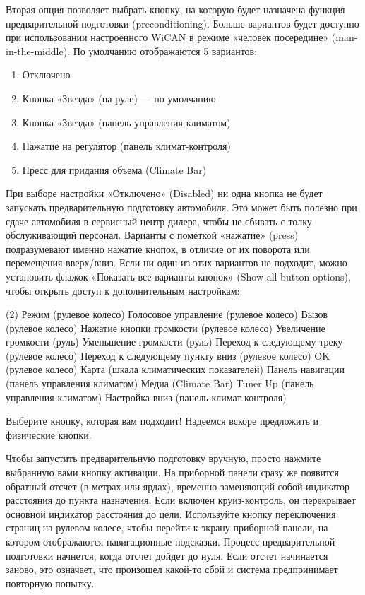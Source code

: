 \documentclass[superscriptaddress,onecolumn,floatfix]{revtex4-2}
\begin{document}
Вторая опция позволяет выбрать кнопку, на которую будет назначена функция предварительной подготовки (preconditioning). Больше вариантов будет доступно при использовании настроенного WiCAN в режиме «человек посередине» (man-in-the-middle). По умолчанию отображаются 5 вариантов:
\begin{enumerate}
  \item Отключено
  \item Кнопка «Звезда» (на руле) — по умолчанию
  \item Кнопка «Звезда» (панель управления климатом)
  \item Нажатие на регулятор (панель климат-контроля)
  \item Пресс для придания объема (Climate Bar)
\end{enumerate}
При выборе настройки «Отключено» (Disabled) ни одна кнопка не будет запускать предварительную подготовку автомобиля. Это может быть полезно при сдаче автомобиля в сервисный центр дилера, чтобы не сбивать с толку обслуживающий персонал. Варианты с пометкой «нажатие» (press) подразумевают именно нажатие кнопок, в отличие от их поворота или перемещения вверх/вниз. Если ни один из этих вариантов не подходит, можно установить флажок «Показать все варианты кнопок» (Show all button options), чтобы открыть доступ к дополнительным настройкам:
\begin{tasks}(2)
  \task Режим (рулевое колесо)
  \task Голосовое управление (рулевое колесо)
  \task Вызов (рулевое колесо)
  \task Нажатие кнопки громкости (рулевое колесо)
  \task Увеличение громкости (руль)
  \task Уменьшение громкости (руль)
  \task Переход к следующему треку (рулевое колесо)
  \task Переход к следующему пункту вниз (рулевое колесо)
  \task OK (рулевое колесо)
  \task Карта (шкала климатических показателей)
  \task Панель навигации (панель управления климатом)
  \task Медиа (Climate Bar)
  \task Tuner Up (панель управления климатом)
  \task Настройка вниз (панель климат-контроля)
\end{tasks}
Выберите кнопку, которая вам подходит! Надеемся вскоре предложить и физические кнопки.

Чтобы запустить предварительную подготовку вручную, просто нажмите выбранную вами кнопку активации. На приборной панели сразу же появится обратный отсчет (в метрах или ярдах), временно заменяющий собой индикатор расстояния до пункта назначения. Если включен круиз-контроль, он перекрывает основной индикатор расстояния до цели. Используйте кнопку переключения страниц на рулевом колесе, чтобы перейти к экрану приборной панели, на котором отображаются навигационные подсказки. Процесс предварительной подготовки начнется, когда отсчет дойдет до нуля. Если отсчет начинается заново, это означает, что произошел какой-то сбой и система предпринимает повторную попытку. 
\end{document}
